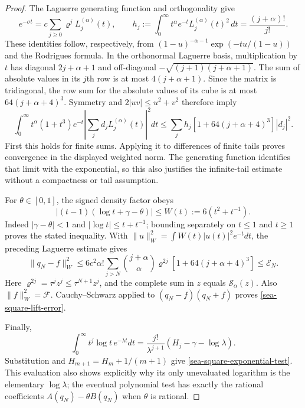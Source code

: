 \documentclass[11pt,a4paper]{article}
\theoremstyle{definition}
\theoremstyle{remark}
\begin{document}
\begin{proof}
The Laguerre generating function and orthogonality \cite{dlmf-laguerre} give
\[
 e^{-\sigma t}=c\sum_{j\ge0}\varrho^jL_j^{(\alpha)}(t),\qquad
 h_j:=\int_0^\infty t^\alpha e^{-t}
                L_j^{(\alpha)}(t)^2\,dt=\frac{(j+\alpha)!}{j!}.
\]
These identities follow, respectively, from
$(1-u)^{-\alpha-1}\exp(-tu/(1-u))$ and the Rodrigues formula.
In the orthonormal Laguerre basis, multiplication by $t$ has diagonal
$2j+\alpha+1$ and off-diagonal
$-\sqrt{(j+1)(j+\alpha+1)}$.  The sum of absolute values in its $j$th row
is at most $4(j+\alpha+1)$.  Since the matrix is tridiagonal, the row sum
for the absolute values of its cube is at most
$64(j+\alpha+4)^3$.  Symmetry and $2|uv|\le u^2+v^2$ therefore imply
\[
 \int_0^\infty t^\alpha(1+t^3)e^{-t}
       \left|\sum_j d_jL_j^{(\alpha)}(t)\right|^2dt
 \le\sum_jh_j[1+64(j+\alpha+4)^3]|d_j|^2.
\]
First this holds for finite sums.  Applying it to differences of finite
tails proves convergence in the displayed weighted norm.  The generating
function identifies that limit with the exponential, so this also justifies
the infinite-tail estimate without a compactness or tail assumption.

For $\theta\in[0,1]$, the signed density factor obeys
\[
 |(t-1)(\log t+\gamma-\theta)|\le W(t):=6(t^2+t^{-1}).
\]
Indeed $|\gamma-\theta|<1$ and $|\log t|\le t+t^{-1}$; bounding separately
on $t\le1$ and $t\ge1$ proves the stated inequality.  With
$\|u\|_W^2=\int W(t)|u(t)|^2e^{-t}dt$, the preceding Laguerre estimate gives
\[
 \|q_N-f\|_W^2
 \le6c^2\alpha!\sum_{j>N}
 \binom{j+\alpha}{\alpha}\varrho^{2j}
       [1+64(j+\alpha+4)^3]
 \le\mathcal E_N.
\]
Here $\varrho^{2j}=\tau^jz^j\le\tau^{N+1}z^j$, and the complete sum in
$z$ equals $\mathcal S_\alpha(z)$.  Also $\|f\|_W^2=\mathcal F$.
Cauchy--Schwarz applied to $(q_N-f)(q_N+f)$ proves
\eqref{sea-square-lift-error}.

Finally,
\[
 \int_0^\infty t^j\log t\,e^{-\lambda t}dt
 =\frac{j!}{\lambda^{j+1}}(H_j-\gamma-\log\lambda).
\]
Substitution and $H_{m+1}=H_m+1/(m+1)$ give
\eqref{sea-square-exponential-test}.  This evaluation also shows explicitly
why its only unevaluated logarithm is the elementary $\log\lambda$;
the eventual polynomial test has exactly the rational coefficients
$A(q_N)-\theta B(q_N)$ when $\theta$ is rational.
\end{proof}
\end{document}
